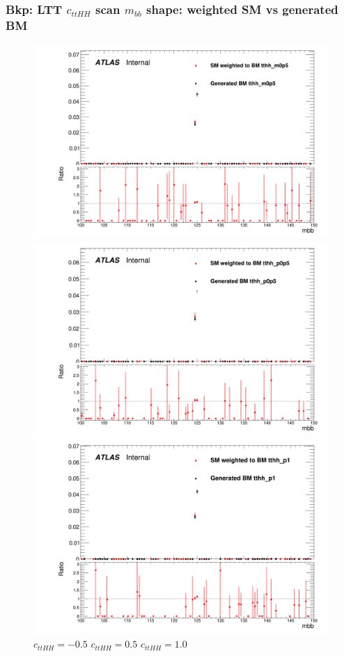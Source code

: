 \documentclass[twoside,11pt]{beamer}
\begin{document}
\begin{frame}
\frametitle{Bkp: LTT $c_{ttHH}$ scan $m_{bb}$ shape: weighted SM vs generated BM}
\begin{figure}
\includegraphics[width=.32\textwidth]{figures/Method_B_all_latest_LTT/BMtthh_m0p5h_mbb.png}
\includegraphics[width=.32\textwidth]{figures/Method_B_all_latest_LTT/BMtthh_p0p5h_mbb.png}
\includegraphics[width=.32\textwidth]{figures/Method_B_all_latest_LTT/BMtthh_p1h_mbb.png}
$c_{ttHH} = -0.5$ \hspace{5em} $c_{ttHH} = 0.5$\hspace{5em} $c_{ttHH} = 1.0$    
\end{figure}

\end{frame}   
\end{document}
